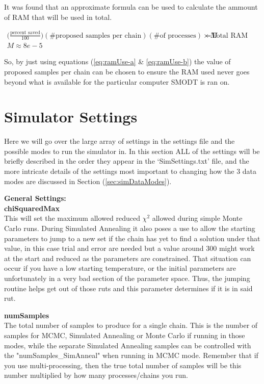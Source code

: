 \documentclass[12pt,preprint]{aastex}
\begin{document}
It was found that an approximate formula can be used to calculate the ammount of RAM that will be used in total.

\begin{subequations}
\begin{align}
\label{eq:ramUse-a}
\big(\frac{\text{percent saved}}{100}\big)(\text{\# proposed samples per chain})(\text{\# of processes})\times M& = \text{Total RAM [MB]}\\
\label{eq:ramUse-b}
M \approx 8e-5
\end{align}
\end{subequations}

So, by just using equations (\ref{eq:ramUse-a} \& \ref{eq:ramUse-b}) the value of proposed samples per chain can be chosen to ensure the RAM used never goes beyond what is available for the particular computer SMODT is ran on.

\clearpage
\section{Simulator Settings}\label{sec:simSettings}

Here we will go over the large array of settings in the settings file and the possible modes to run the simulator in.  In this section ALL of the settings will be briefly described in the order they appear in the `SimSettings.txt' file, and the more intricate details of the settings most important to changing how the 3 data modes are discussed in Section (\ref{sec:simDataModes}).


{\bf \color{blue} General Settings: }\\
{\bf chiSquaredMax}\\
This will set the maximum allowed reduced $\chi^2$ allowed during simple Monte Carlo runs.  During Simulated Annealing it also poses a use to allow the starting parameters to jump to a new set if the chain has yet to find a solution under that value, in this case trial and error are needed but a value around 300 might work at the start and reduced as the parameters are constrained.  That situation can occur if you have a low starting temperature, or the initial parameters are unfortunately in a very bad section of the parameter space.  Thus, the jumping routine helps get out of those ruts and this parameter determines if it is in said rut.

{\bf numSamples}\\
The total number of samples to produce for a single chain.  This is the number of samples for MCMC, Simulated Annealing or Monte Carlo if running in those modes, while the separate Simulated Annealing samples can be controlled with the "numSamples\_SimAnneal" when running in MCMC mode.  Remember that if you use multi-processing, then the true total number of samples will be this number multiplied by how many processes/chains you run.
\end{document}

